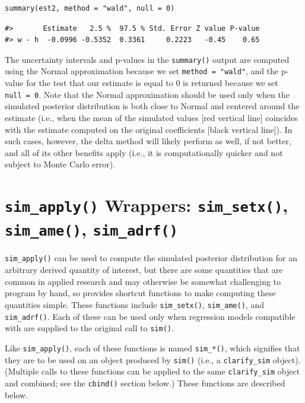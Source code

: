 \begin{verbatim}
summary(est2, method = "wald", null = 0)
\end{verbatim}

\begin{verbatim}
#>       Estimate   2.5 %  97.5 % Std. Error Z value P-value
#> w - h  -0.0996 -0.5352  0.3361     0.2223   -0.45    0.65
\end{verbatim}

The uncertainty intervals and p-values in the \texttt{summary()} output are computed using the Normal approximation because we set \texttt{method\ =\ "wald"}, and the p-value for the test that our estimate is equal to 0 is returned because we set \texttt{null\ =\ 0}. Note that the Normal approximation should be used only when the simulated posterior distribution is both close to Normal and centered around the estimate (i.e., when the mean of the simulated values {[}red vertical line{]} coincides with the estimate computed on the original coefficients {[}black vertical line{]}). In such cases, however, the delta method will likely perform as well, if not better, and all of its other benefits apply (i.e., it is computationally quicker and not subject to Monte Carlo error).

\section{\texorpdfstring{\texttt{sim\_apply()} Wrappers: \texttt{sim\_setx()}, \texttt{sim\_ame()}, \texttt{sim\_adrf()}}{sim\_apply() Wrappers: sim\_setx(), sim\_ame(), sim\_adrf()}}\label{sim_apply-wrappers-sim_setx-sim_ame-sim_adrf}

\texttt{sim\_apply()} can be used to compute the simulated posterior distribution for an arbitrary derived quantity of interest, but there are some quantities that are common in applied research and may otherwise be somewhat challenging to program by hand, so  provides shortcut functions to make computing these quantities simple. These functions include \texttt{sim\_setx()}, \texttt{sim\_ame()}, and \texttt{sim\_adrf()}. Each of these can be used only when regression models compatible with  are supplied to the original call to \texttt{sim()}.

Like \texttt{sim\_apply()}, each of these functions is named \texttt{sim\_*()}, which signifies that they are to be used on an object produced by \texttt{sim()} (i.e., a \texttt{clarify\_sim} object). (Multiple calls to these functions can be applied to the same \texttt{clarify\_sim} object and combined; see the \texttt{cbind()} section below.) These functions are described below.

